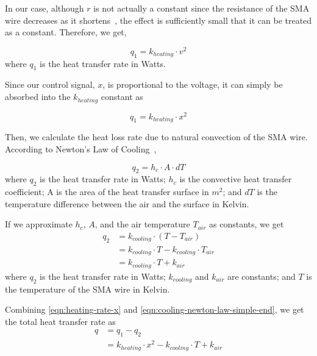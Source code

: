 In our case, although $r$ is not actually a constant since the resistance of the SMA wire decreases as it shortens~\cite{FlexinolTechSpecs}, the effect is sufficiently small that it can be treated as a constant. Therefore, we get,

\begin{equation}\label{eqn:heating-rate-i}
q_1 = k_{heating} \cdot v^2
\end{equation}
where $q_1$ is the heat transfer rate in Watts.

Since our control signal, $x$, is proportional to the voltage, it can simply be absorbed into the $k_{heating}$ constant as 

\begin{equation}\label{eqn:heating-rate-x}
q_1 = k_{heating} \cdot x^2
\end{equation}

Then, we calculate the heat loss rate due to natural convection of the SMA wire. According to Newton's Law of Cooling~\cite{Burmeister1993}, 

\begin{equation}\label{eqn:cooling-newton-law}
q_2 = h_c \cdot A \cdot dT
\end{equation}
where $q_2$ is the heat transfer rate in Watts; $h_c$ is the convective heat transfer coefficient; A is the area of the heat transfer surface in $m^2$; and $dT$ is the temperature difference between the air and the surface in Kelvin.

If we approximate $h_c$, $A$, and the air temperature $T_{air}$ as constants, we get
\begin{subequations}\label{eqn:cooling-newton-law-simple}
	\begin{flalign}
	q_2 &= k_{cooling} \cdot (T - T_{air}) \\
	&= k_{cooling} \cdot T - k_{cooling} \cdot T_{air} \\
	&= k_{cooling} \cdot T + k_{air}\label{eqn:cooling-newton-law-simple-end}
	\end{flalign}
\end{subequations}
where $q_2$ is the heat transfer rate in Watts; $k_{cooling}$ and $k_{air}$ are constants; and $T$ is the temperature of the SMA wire in Kelvin.

Combining \eqref{eqn:heating-rate-x} and \eqref{eqn:cooling-newton-law-simple-end}, we get the total heat transfer rate as 
\begin{subequations}
	\begin{flalign}
	q &= q_1 - q_2 \\
	&= k_{heating} \cdot x^2 - k_{cooling} \cdot T + k_{air}\label{eqn:total_heat}
	\end{flalign}
\end{subequations}


